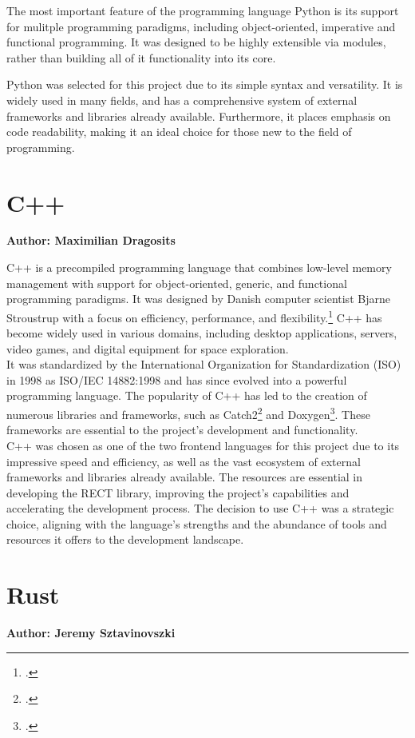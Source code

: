 The most important feature of the programming language Python is its support for mulitple programming paradigms, including object-oriented, imperative and functional programming. It was designed to be highly extensible via modules, rather than building all of it functionality into its core.

Python was selected for this project due to its simple syntax and versatility. It is widely used in many fields, and has a comprehensive system of external frameworks and libraries already available. Furthermore, it places emphasis on code readability, making it an ideal choice for those new to the field of programming.

\section{C++}
\textbf{Author: Maximilian Dragosits}

C++ is a precompiled programming language that combines low-level memory management with support for object-oriented, generic, and functional programming paradigms. 
It was designed by Danish computer scientist Bjarne Stroustrup with a focus on efficiency, performance, and flexibility.\footcite{lecture_essence_cpp} C++ has 
become widely used in various domains, including desktop applications, servers, video games, and digital equipment for space exploration.\\

It was standardized by the International Organization for Standardization (ISO) in 1998 as ISO/IEC 14882:1998 and has since evolved into a powerful programming 
language. The popularity of C++ has led to the creation of numerous libraries and frameworks, such as Catch2\footcite{catch2_git} and Doxygen\footcite{doxygen_main_site}. 
These frameworks are essential to the project's development and functionality.\\

C++ was chosen as one of the two frontend languages for this project due to its impressive speed and efficiency, as well as the vast ecosystem of external 
frameworks and libraries already available. The resources are essential in developing the RECT library, improving the project's capabilities and accelerating 
the development process. The decision to use C++ was a strategic choice, aligning with the language's strengths and the abundance of tools and resources it 
offers to the development landscape.

\section{Rust}
\textbf{Author: Jeremy Sztavinovszki}

